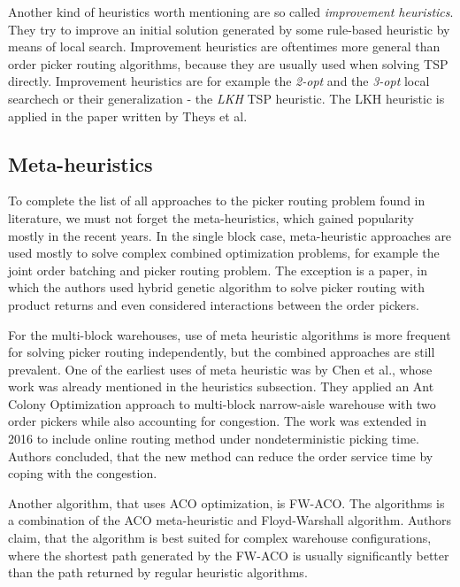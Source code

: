 \par
Another kind of heuristics worth mentioning are so called \emph{improvement heuristics}. They try to improve an initial solution generated by some rule-based heuristic by means of local search. Improvement heuristics are oftentimes more general than order picker routing algorithms, because they are usually used when solving TSP directly.  Improvement heuristics are for example the \emph{2-opt} and the \emph{3-opt} local searchech or their generalization - the \emph{LKH} TSP heuristic. The LKH heuristic is applied in the paper written by Theys et al\cite{theys2010}.



\subsection{Meta-heuristics}
To complete the list of all approaches to the picker routing problem found in literature, we must not forget the meta-heuristics, which gained popularity mostly in the recent years. In the single block case, meta-heuristic approaches are used mostly to solve complex  combined optimization problems, for example the joint order batching and picker routing problem. The exception is a paper, in which the authors used hybrid genetic algorithm to solve picker routing with product returns and even considered interactions between the order pickers\cite{schr2017}.
\par

For the multi-block warehouses, use of meta heuristic algorithms is more frequent for solving picker routing independently, but the combined approaches are still prevalent. One of the earliest uses of meta heuristic was by Chen et al.\cite{chen2013ant}, whose work was already mentioned in the heuristics subsection. They applied an Ant Colony Optimization approach to multi-block narrow-aisle warehouse with two order pickers while also accounting for congestion. The work was extended in 2016 to include online routing method under nondeterministic picking time\cite{chen2016}. Authors concluded, that the new method can reduce the order service time by coping with the congestion.
\par

Another algorithm, that uses ACO optimization, is FW-ACO\cite{de2018}. The algorithms is a combination of the ACO meta-heuristic and Floyd-Warshall algorithm. Authors claim, that the algorithm is best suited for complex warehouse configurations, where the shortest path generated by the FW-ACO is usually significantly better than the path returned by regular heuristic algorithms.
\par




